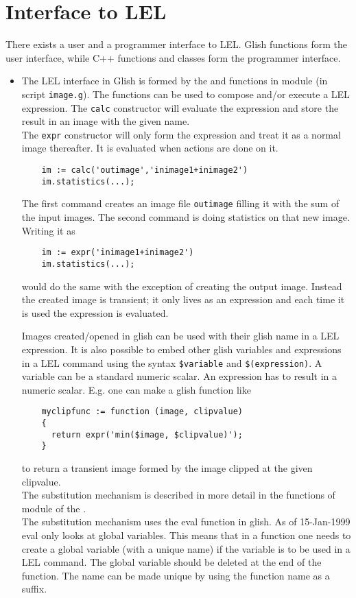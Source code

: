\section{\label{LEL:GLISHC}Interface to LEL}
There exists a user and a programmer interface to LEL.
Glish functions form the user interface, while C++ functions
and classes form the programmer interface.
\begin{itemize}
\item
  The LEL interface in Glish is formed by the
   and
   functions in module
   (in script \texttt{image.g}).
  The functions can be used
  to compose and/or execute a LEL expression.
  The \texttt{calc} constructor will evaluate the expression and store
  the result in an image with the given name.
  \\The \texttt{expr} constructor will only form the expression and
  treat it as a normal image thereafter.
  It is evaluated when actions are done on it.
  \begin{verbatim}
    im := calc('outimage','inimage1+inimage2')
    im.statistics(...);
  \end{verbatim}
  The first command creates an image file \texttt{outimage} filling
  it with the sum of the input images. The second command is
  doing statistics on that new image.
  \\Writing it as
  \begin{verbatim}
    im := expr('inimage1+inimage2')
    im.statistics(...);
  \end{verbatim}
  would do the same with the exception of creating the output image.
  Instead the created image is transient; it only lives as an
  expression and each time it is used the expression is evaluated.

  Images created/opened in glish can be used with their glish name
  in a LEL expression.
  It is also possible to embed other glish variables and expressions in a LEL
  command using the syntax \texttt{\$variable} and
  \texttt{\$(expression)}. A variable can be a standard numeric scalar.
  An expression has to result in a numeric scalar.
  E.g. one can make a glish function like
  \begin{verbatim}
    myclipfunc := function (image, clipvalue)
    {
      return expr('min($image, $clipvalue)');
    }
  \end{verbatim}
  to return a transient image formed by the image clipped at the
  given clipvalue.
  \\The substitution mechanism is described in more detail in the
  functions of module
   of the
  .
  \\The substitution mechanism uses the eval function in glish.
  As of 15-Jan-1999 eval only looks at global variables. This means
  that in a function one needs to create a global variable (with
  a unique name) if the variable is to be used in a LEL command.
  The global variable should be deleted at the end of the function.
  The name can be made unique by using the function name as a suffix.


\end{itemize}
